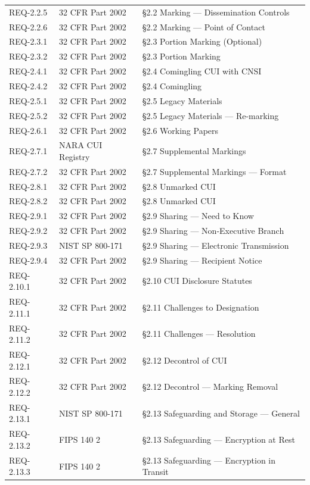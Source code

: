 \documentclass[11pt,letterpaper]{article}
\begin{document}
\begin{longtable}{@{}l l p{8cm}@{}}
REQ-2.2.5 & 32 CFR Part 2002 & \S2.2 Marking --- Dissemination Controls \\
REQ-2.2.6 & 32 CFR Part 2002 & \S2.2 Marking --- Point of Contact \\
REQ-2.3.1 & 32 CFR Part 2002 & \S2.3 Portion Marking (Optional) \\
REQ-2.3.2 & 32 CFR Part 2002 & \S2.3 Portion Marking \\
REQ-2.4.1 & 32 CFR Part 2002 & \S2.4 Comingling CUI with CNSI \\
REQ-2.4.2 & 32 CFR Part 2002 & \S2.4 Comingling \\
REQ-2.5.1 & 32 CFR Part 2002 & \S2.5 Legacy Materials \\
REQ-2.5.2 & 32 CFR Part 2002 & \S2.5 Legacy Materials --- Re-marking \\
REQ-2.6.1 & 32 CFR Part 2002 & \S2.6 Working Papers \\
REQ-2.7.1 & NARA CUI Registry & \S2.7 Supplemental Markings \\
REQ-2.7.2 & 32 CFR Part 2002 & \S2.7 Supplemental Markings --- Format \\
REQ-2.8.1 & 32 CFR Part 2002 & \S2.8 Unmarked CUI \\
REQ-2.8.2 & 32 CFR Part 2002 & \S2.8 Unmarked CUI \\
REQ-2.9.1 & 32 CFR Part 2002 & \S2.9 Sharing --- Need to Know \\
REQ-2.9.2 & 32 CFR Part 2002 & \S2.9 Sharing --- Non-Executive Branch \\
REQ-2.9.3 & NIST SP 800-171 & \S2.9 Sharing --- Electronic Transmission \\
REQ-2.9.4 & 32 CFR Part 2002 & \S2.9 Sharing --- Recipient Notice \\
REQ-2.10.1 & 32 CFR Part 2002 & \S2.10 CUI Disclosure Statutes \\
REQ-2.11.1 & 32 CFR Part 2002 & \S2.11 Challenges to Designation \\
REQ-2.11.2 & 32 CFR Part 2002 & \S2.11 Challenges --- Resolution \\
REQ-2.12.1 & 32 CFR Part 2002 & \S2.12 Decontrol of CUI \\
REQ-2.12.2 & 32 CFR Part 2002 & \S2.12 Decontrol --- Marking Removal \\
REQ-2.13.1 & NIST SP 800-171 & \S2.13 Safeguarding and Storage --- General \\
REQ-2.13.2 & FIPS 140 2 & \S2.13 Safeguarding --- Encryption at Rest \\
REQ-2.13.3 & FIPS 140 2 & \S2.13 Safeguarding --- Encryption in Transit \\

\end{longtable}
\end{document}
